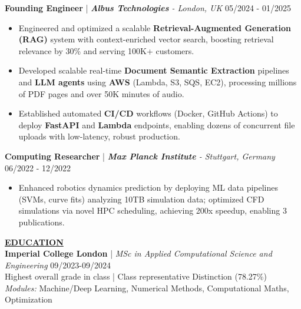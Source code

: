 \documentclass{article}
\newlength{\remaining}
\renewcommand{\section}[1]{
  \vspace{1.0em}\setlength{\remaining}{\textwidth-\widthof{\uppercase{#1}}}
    \noindent\underline{\fontsize{10}{15}\bfseries\uppercase{#1}\hspace*{\remaining}} \\
}
\renewcommand{\subsection}[3]{
    \noindent\textbf{#1} | \emph{#2} \hfill #3  
}
\begin{document}
    \subsection{Founding Engineer}{\textbf{Albus Technologies} - London, UK}{05/2024 - 01/2025}
    \begin{itemize}
        \item Engineered and optimized a scalable \textbf{Retrieval-Augmented Generation (RAG)} system with context-enriched vector search, boosting retrieval relevance by 30\% and serving 100K+ customers.
        \item Developed scalable real-time \textbf{Document Semantic Extraction} pipelines and \textbf{LLM agents} using \textbf{AWS} (Lambda, S3, SQS, EC2), processing millions of PDF pages and over 50K minutes of audio.
        \item Established automated \textbf{CI/CD} workflows (Docker, GitHub Actions) to deploy \textbf{FastAPI} and \textbf{Lambda} endpoints, enabling dozens of concurrent file uploads with low-latency, robust production.
    \end{itemize}
    

    \subsection{Computing Researcher}{\textbf{Max Planck Institute} - Stuttgart, Germany}{06/2022 - 12/2022}
    \begin{itemize}
        \item Enhanced robotics dynamics prediction by deploying ML data pipelines (SVMs, curve fits) analyzing 10TB simulation data; optimized CFD simulations via novel HPC scheduling, achieving 200x speedup, enabling 3 publications.
    \end{itemize}

    
    \section{Education}
    \subsection{Imperial College London}{MSc in Applied Computational Science and Engineering}{09/2023-09/2024} \\
    Highest overall grade in class | Class representative  \hfill Distinction (78.27\%) \\
    \textit{Modules:} Machine/Deep Learning, Numerical Methods, Computational Maths, Optimization
    
\end{document}
